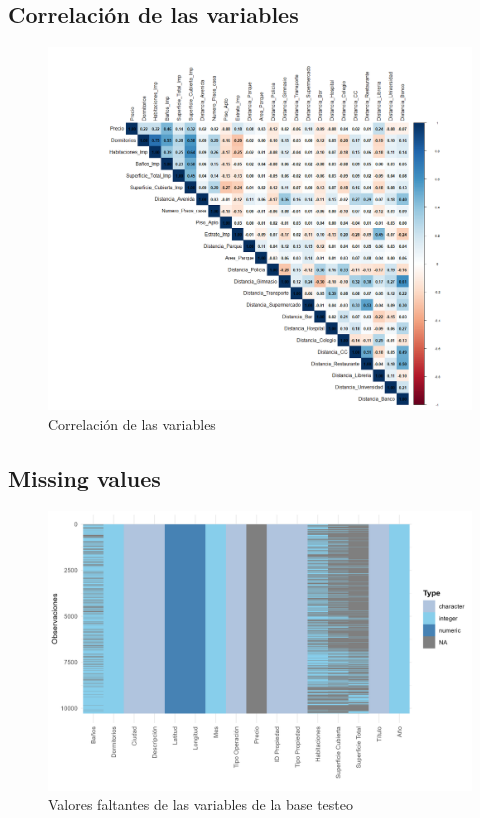 \documentclass[a4paper]{article}
\theoremstyle{remark}
\theoremstyle{definition}
\begin{document}
\subsection{Correlación de las variables}

\begin{figure}[H]
    \centering
    \caption{Correlación de las variables}
    \includegraphics[width=0.9\linewidth]{Graficas/graf_corr_completa.png}
\end{figure}



\subsection{Missing values}
\begin{figure}[H]
    \centering
    \caption{Valores faltantes de las variables de la base testeo}
    \includegraphics[width=0.75\linewidth]{Graficas/graf_miss_f2_test.png}
\end{figure}
\end{document}
